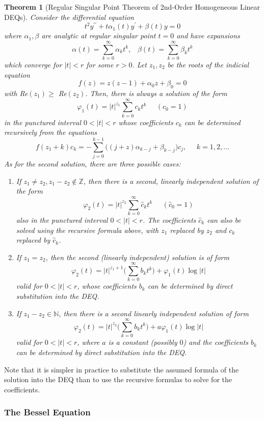 \documentclass{article}
\newtheorem{theorem}{Theorem}[section]
\theoremstyle{remark}
\theoremstyle{definition}
\begin{document}
\begin{theorem}[Regular Singular Point Theorem of 2nd-Order Homogeneous Linear DEQs]
Consider the differential equation
\[t^2 y^{\prime\prime} + t \alpha_1 (t) y^\prime + \beta (t) y = 0\]
where $\alpha_1, \beta$ are analytic at regular singular point $t = 0$ and have expansions
\[\alpha (t) = \sum_{k=0}^\infty \alpha_k t^k, \;\;\; \beta(t) = \sum_{k=0}^\infty \beta_k t^k\]
which converge for $|t|<r$ for some $r>0$. Let $z_1, z_2$ be the roots of the indicial equation
\[f(z) = z(z-1) + \alpha_0 z + \beta_0 = 0\]
with Re$(z_1) \geq$ Re$(z_2)$. Then, there is always a solution of the form 
\[\varphi_1 (t) = |t|^{z_1} \sum_{k=0}^\infty c_k t^k \;\;\;\;\; (c_0 = 1)\]
in the punctured interval $0<|t|<r$ whose coefficients $c_k$ can be determined recursively from the equations
\[f(z_1 + k) c_k = - \sum_{j=0}^{k-1} \big((j+z)\alpha_{k-j} + \beta_{k-j}\big) c_j, \;\;\;\;\; k = 1, 2, \ldots\]
As for the second solution, there are three possible cases: 
\begin{enumerate}
    \item If $z_1 \neq z_2, z_1 - z_2 \not\in \mathbb{Z}$, then there is a second, linearly independent solution of the form 
    \[\varphi_2 (t) = |t|^{z_2} \sum_{k=0}^\infty \hat{c}_k t^k \;\;\;\;\; (\hat{c}_0 = 1)\]
    also in the punctured interval $0 < |t| < r$. The coefficients $\hat{c}_k$ can also be solved using the recursive formula above, with $z_1$ replaced by $z_2$ and $c_k$ replaced by $\hat{c}_k$. 
    \item If $z_1 = z_2$, then the second (linearly independent) solution is of form
    \[\varphi_2 (t) = |t|^{z_1 + 1} \bigg( \sum_{k=0}^\infty b_k t^k\bigg) + \varphi_1 (t) \log{|t|}\]
    valid for $0<|t|<r$, whose coefficients $b_k$ can be determined by direct substitution into the DEQ. 
    \item If $z_1 - z_2 \in \mathbb{N}$, then there is a second linearly independent solution of form 
    \[\varphi_2 (t) = |t|^{z_2} \bigg( \sum_{k=0}^\infty b_k t^k \bigg) + a \varphi_1 (t) \log{|t|}\]
    valid for $0<|t|<r$, where $a$ is a constant (possibly $0$) and the coefficients $b_k$ can be determined by direct substitution into the DEQ. 
\end{enumerate}
\end{theorem}

Note that it is simpler in practice to substitute the assumed formula of the solution into the DEQ than to use the recursive formulas to solve for the coefficients. 

\subsubsection{The Bessel Equation}
\end{document}
